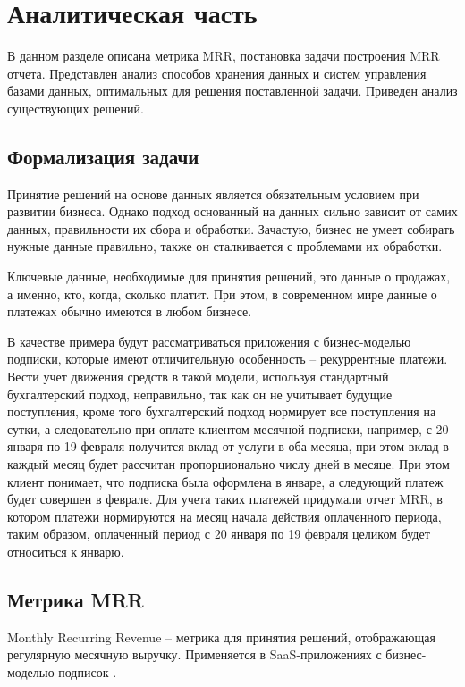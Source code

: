 \chapter{Аналитическая часть}

В данном разделе описана метрика MRR, постановка задачи построения MRR отчета. Представлен анализ способов хранения данных и систем управления базами данных, оптимальных для решения поставленной задачи. Приведен анализ существующих решений.

\section{Формализация задачи}

Принятие решений на основе данных является обязательным условием при развитии бизнеса. Однако подход основанный на данных сильно зависит от самих данных, правильности их сбора и обработки. Зачастую, бизнес не умеет собирать нужные данные правильно, также он сталкивается с проблемами их обработки.

Ключевые данные, необходимые для принятия решений, это данные о продажах, а именно, кто, когда, сколько платит. При этом, в современном мире данные о платежах обычно имеются в любом бизнесе.

В качестве примера будут рассматриваться приложения с бизнес-моделью подписки, которые имеют отличительную особенность -- рекуррентные платежи. Вести учет движения средств в такой модели, используя стандартный бухгалтерский подход, неправильно, так как он не учитывает будущие поступления, кроме того бухгалтерский подход нормирует все поступления на сутки, а следовательно при оплате клиентом месячной подписки, например, с 20 января по 19 февраля получится вклад от услуги в оба месяца, при этом вклад в каждый месяц будет рассчитан пропорционально числу дней в месяце. При этом клиент понимает, что подписка была оформлена в январе, а следующий платеж будет совершен в феврале. Для учета таких платежей придумали отчет MRR, в котором платежи нормируются на месяц начала действия оплаченного периода, таким образом, оплаченный период с 20 января по 19 февраля целиком будет относиться к январю.

\section{Метрика MRR}

Monthly Recurring Revenue -- метрика для принятия решений, отображающая регулярную месячную выручку. Применяется в SaaS-приложениях \cite{saas} с бизнес-моделью подписок \cite{mrr}.

